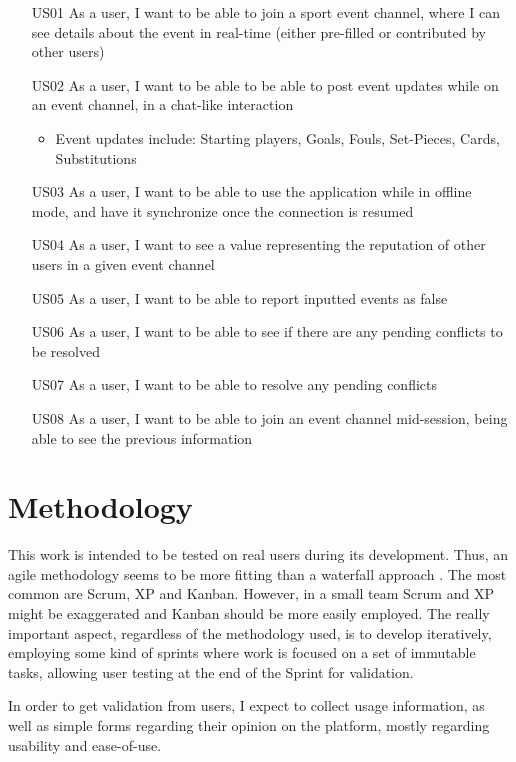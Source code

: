 \begin{itemize}[leftmargin  = 3.25\parindent, align=left]
    \item[US01] As a user, I want to be able to join a sport event channel, where I can see details about the event in real-time (either pre-filled or contributed by other users)
    \item[US02] As a user, I want to be able to be able to post event updates while on an event channel, in a chat-like interaction
    \begin{itemize}
        \item Event updates include: Starting players, Goals, Fouls, Set-Pieces, Cards, Substitutions
    \end{itemize} 
    \item[US03] As a user, I want to be able to use the application while in offline mode, and have it synchronize once the connection is resumed
    \item[US04] As a user, I want to see a value representing the reputation of other users in a given event channel
    \item[US05] As a user, I want to be able to report inputted events as false
    \item[US06] As a user, I want to be able to see if there are any pending conflicts to be resolved
    \item[US07] As a user, I want to be able to resolve any pending conflicts
    \item[US08] As a user, I want to be able to join an event channel mid-session, being able to see the previous information
\end{itemize}


\section{Methodology}\label{sec:prob-methodology}

This work is intended to be tested on real users during its development. Thus, an agile methodology seems to be more fitting than a waterfall approach \cite{beck2001agile}. The most common are Scrum, XP and Kanban. However, in a small team Scrum and XP might be exaggerated and Kanban should be more easily employed. The really important aspect, regardless of the methodology used, is to develop iteratively, employing some kind of sprints where work is focused on a set of immutable tasks, allowing user testing at the end of the Sprint for validation. 

In order to get validation from users, I expect to collect usage information, as well as simple forms regarding their opinion on the platform, mostly regarding usability and ease-of-use. 

